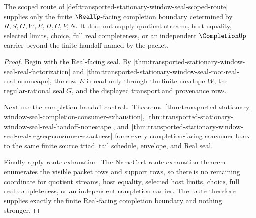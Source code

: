\begin{theorem}
\label{thm:transported-stationary-window-seal-real-completion-boundary}
The scoped route of \autoref{def:transported-stationary-window-seal-scoped-route} supplies only the finite $\RealUp$-facing completion boundary determined by $R,S,G,W,E,H,C,P,N$. It does not supply quotient streams, host equality, selected limits, choice, full real completeness, or an independent $\CompletionUp$ carrier beyond the finite handoff named by the packet.
\end{theorem}
\begin{proof}
Begin with the Real-facing seal. By \autoref{thm:transported-stationary-window-seal-real-factorization} and \autoref{thm:transported-stationary-window-seal-root-real-seal-nonescape}, the row $E$ is read only through the finite envelope $W$, the regular-rational seal $G$, and the displayed transport and provenance rows.

Next use the completion handoff controls. Theorems~\ref{thm:transported-stationary-window-seal-completion-consumer-exhaustion}, \ref{thm:transported-stationary-window-seal-real-handoff-nonescape}, and~\ref{thm:transported-stationary-window-seal-real-regseq-consumer-exactness} force every completion-facing consumer back to the same finite source triad, tail schedule, envelope, and Real seal.

Finally apply route exhaustion. The NameCert route exhaustion theorem enumerates the visible packet rows and support rows, so there is no remaining coordinate for quotient streams, host equality, selected host limits, choice, full real completeness, or an independent completion carrier. The route therefore supplies exactly the finite Real-facing completion boundary and nothing stronger.
\end{proof}
